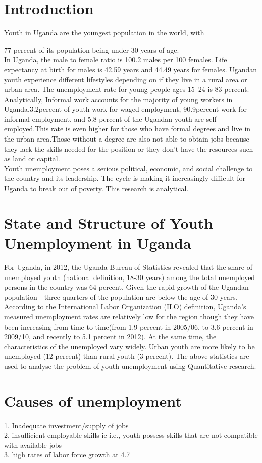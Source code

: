 \documentclass[9pt,]{article}
\begin{document}
\section{Introduction}
Youth in Uganda are the youngest population in the world, with {77 percent of its population being under 30 years of age.\\In Uganda, the male to female ratio is 100.2 males per 100 females. Life expectancy at birth for males is 42.59 years and 44.49 years for females. Ugandan youth experience different lifestyles depending on if they live in a rural area or urban area. The unemployment rate for young people ages 15–24 is 83 percent.
Analytically, Informal work accounts for the majority of young workers in Uganda.3.2percent of youth work for waged employment, 90.9percent work for informal employment, and 5.8 percent of the Ugandan youth are self-employed.This rate is even higher for those who have formal degrees and live in the urban area.Those without a degree are also not able to obtain jobs because they lack the skills needed for the position or they don’t have the resources such as land or capital.\\Youth unemployment poses a serious political, economic, and social challenge to the country and its leadership. The cycle is making it increasingly difficult for Uganda to break out of poverty. This research is analytical.


\section{State and Structure of Youth Unemployment in Uganda}
For Uganda, in 2012, the Uganda Bureau of Statistics revealed that the share of unemployed youth (national definition, 18-30 years) among the total unemployed persons in the country was 64 percent. Given the rapid growth of the Ugandan population—three-quarters of the population are below the age of 30 years.
According to the International Labor Organization (ILO) definition, Uganda’s measured unemployment  rates are relatively low for the region though they have been increasing from time to time(from 1.9 percent in 2005/06, to 3.6 percent in 2009/10, and recently to 5.1 percent in 2012). At the same time, the characteristics of the unemployed vary widely. Urban youth are more likely to be unemployed (12 percent) than rural youth (3 percent). The above statistics are  used to analyse the problem of youth unemployment using Quantitative research.


\section{Causes of unemployment}
1.	Inadequate investment/supply of jobs
\\2.	insufficient employable skills ie i.e., youth possess skills that are not compatible with available jobs
\\3.	high rates of labor force growth at 4.7%

}
\end{document}
